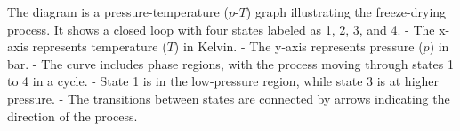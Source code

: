 The diagram is a pressure-temperature (\(p\)-\(T\)) graph illustrating the freeze-drying process. It shows a closed loop with four states labeled as 1, 2, 3, and 4.  
- The x-axis represents temperature (\(T\)) in Kelvin.  
- The y-axis represents pressure (\(p\)) in bar.  
- The curve includes phase regions, with the process moving through states 1 to 4 in a cycle.  
- State 1 is in the low-pressure region, while state 3 is at higher pressure.  
- The transitions between states are connected by arrows indicating the direction of the process.